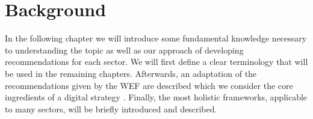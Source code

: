 \section{Background}
In the following chapter we will introduce some fundamental knowledge necessary to understanding the topic as well as our approach of developing recommendations for each sector. We will first define a clear terminology that will be used in the remaining chapters. Afterwards, an adaptation of the recommendations given by the \ac{WEF} are described which we consider the core ingredients of a digital strategy \cite{worldforumdigitalenterprise:2016}. Finally, the most holistic frameworks, applicable to many sectors, will be briefly introduced and described.

